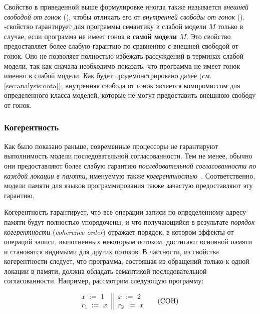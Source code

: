 Свойство \DRF в приведенной  выше формулировке иногда также называется
\emph{внешней свободой от гонок} (\eDRF), 
чтобы отличать его от \emph{внутренней свободы от гонок} (\iDRF).
\iDRF-свойство гарантирует для программы семантику \SC
в слабой модели $M$ только в случае, если программа 
не имеет гонок в \textbf{самой модели $M$}.
Это свойство предоставляет более слабую гарантию
по сравнению с внешней свободой от гонок. 
Оно не позволяет полностью избежать рассуждений 
в терминах слабой модели, так как 
сначала необходимо показать, что программа не имеет гонок именно в слабой модели. 
Как будет продемонстрировано далее (\emph{см.} \cref{sec:analysis:oota}), 
внутренняя свобода от гонок является компромиссом 
для определенного класса моделей, которые не могут 
предоставить внешнюю свободу от гонок. 

\subsubsection{Когерентность}
\label{sec:background:coh}

Как было показано раньше, современные процессоры
не гарантируют выполнимость модели последовательной согласованности. 
Тем не менее, обычно они предоставляют более слабую 
гарантию \emph{последовательной согласованности 
по каждой локации в памяти}, именуемую также 
\emph{когерентностью}~\cite{Alglave-al:TOPLAS14}. 
Соответственно, модели памяти 
для языков программирования также зачастую предоставляют эту гарантию.

Когерентность гарантирует, что все операции записи 
по определенному адресу памяти будут полностью упорядочены,
и что получающийся в результате \emph{порядок когерентности} 
(\emph{coherence order}) отражает порядок, 
в котором эффекты от операций записи, выполненных некоторым потоком, 
достигают основной памяти и становятся видимыми для других потоков.
В частности, из свойства когерентности следует, 
что программа, состоящая из обращений только 
к одной локации в памяти, должна 
обладать семантикой последовательной согласованности.
Например, рассмотрим следующую программу:

\begin{equation*}
\inarrII{
   \writeInst{}{x}{1}   \\
   \readInst{}{r_1}{x}  \\
}{
   \writeInst{}{x}{2}   \\
   \readInst{}{r_2}{x}  \\
}
\tag{COH}\label{ex:coh}
\end{equation*}

